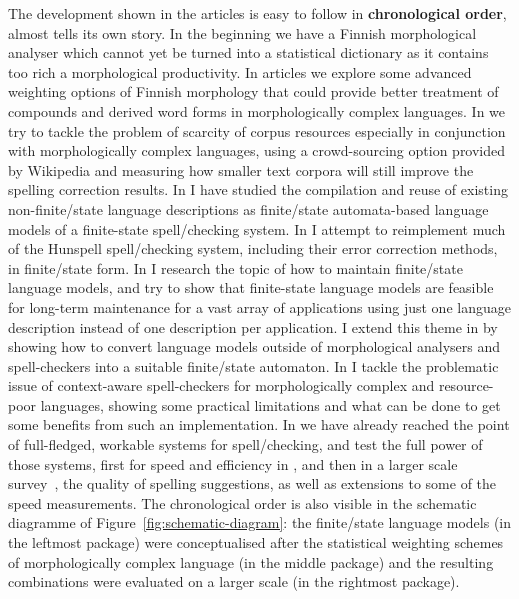 \documentclass[officiallayout,final]{unihelcompling}
\begin{document}
The development shown in the articles is easy to follow in
\textbf{chronological order}, almost tells its own story. In the beginning we
have a Finnish morphological analyser \citep{pirinen2008suomen} which cannot
yet be turned into a statistical dictionary as it contains too rich a
morphological productivity. In articles
 we explore some advanced
weighting options of Finnish morphology that could provide better treatment of
compounds and derived word forms in morphologically complex languages. In
 we try to tackle the problem of scarcity of
corpus resources especially in conjunction with morphologically complex
languages, using a crowd-sourcing option provided by Wikipedia and measuring
how smaller text corpora will still improve the spelling correction results. In
 I have studied the
compilation and reuse of existing non-finite\-/state language descriptions as
finite\-/state automata-based language models of a finite-state
spell\-/checking system.  In  I attempt to
reimplement much of the Hunspell spell\-/checking system, including their error
correction methods, in finite\-/state form. In
 I research the topic of how to maintain
finite\-/state \glspl{language model}, and try to show that finite-state
language models are feasible for long-term maintenance for a vast array of
applications using just one language description instead of one description per
application.  I extend this theme in  by
showing how to convert language models outside of morphological analysers and
spell-checkers into a suitable finite\-/state automaton. In
 I tackle the problematic issue of
context-aware spell-checkers for morphologically complex and resource-poor
languages, showing some practical limitations and what can be done to get some
benefits from such an implementation. In
 we have already reached the
point of full-fledged, workable systems for spell\-/checking, and test the full
power of those systems, first for speed and efficiency in
, and then in a larger scale
survey~, the quality of spelling suggestions, as
well as extensions to some of the speed measurements.  The chronological order
is also visible in the schematic diagramme of
Figure~\ref{fig:schematic-diagram}: the finite\-/state language models (in the
leftmost package) were conceptualised after the statistical weighting schemes
of morphologically complex language (in the middle package) and the resulting
combinations were evaluated on a larger scale (in the rightmost package).
\end{document}
